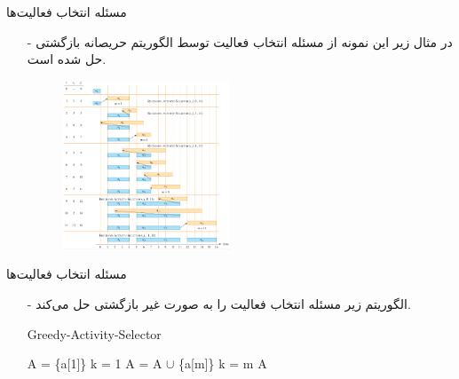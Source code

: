 \begin{frame}{‌مسئله انتخاب فعالیت‌ها}
\begin{itemize}\itemr
\item[-]
در مثال زیر این نمونه از مسئله انتخاب فعالیت توسط الگوریتم حریصانه بازگشتی حل شده است.
\begin{figure}
\includegraphics[width=0.47\textwidth]{figs/chap05/activity-recursive-example}
\end{figure}
\end{itemize}
\end{frame}

\begin{frame}{‌مسئله انتخاب فعالیت‌ها}
\begin{itemize}\itemr
\item[-]
الگوریتم زیر مسئله انتخاب فعالیت را به صورت غیر بازگشتی حل می‌کند.
\begin{algorithm}[H]\alglr
  \caption{Greedy-Activity-Selector} 
  \begin{algorithmic}[1]
   \State A = \{a[1]\}
   \State k = 1
   		 
   				\State A = A $\cup$ \{a[m]\} 
   				\State k = m 
   		\EndIf
   	\EndFor
    \State \Return A                       
  \end{algorithmic}
  \label{alg:merge}
\end{algorithm}
\end{itemize}
\end{frame}
